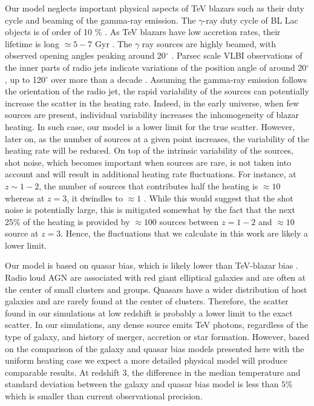 \documentclass[numberedappendix]{emulateapj}
\begin{document}
Our model neglects important physical aspects of TeV blazars such as their duty cycle and beaming of the gamma-ray emission. The $\gamma$-ray duty cycle of BL Lac objects is of order of 10 $\%$ \citep{1996ApJ...464..600S}. As TeV blazars have low accretion rates, their lifetime is long $\simeq 5-7$ Gyr \citep{2002ApJ...571..226C}. The $\gamma$ ray sources are highly beamed, with observed opening angles peaking around 20$^{\circ}$ \citep{2009A&A...507L..33P}. Parsec scale VLBI observations of the inner parts of radio jets indicate variations of the position angle of around 20$^{\circ}$, up to 120$^{\circ}$ over more than a decade \citep{2013AJ....146..120L}. Assuming the gamma-ray emission follows the orientation of the radio jet, the rapid variability of the sources can potentially increase the scatter in the heating rate. Indeed, in the early universe, when few sources are present,  individual variability increases the inhomogeneity of blazar heating. In such case, our model is a lower limit for the true scatter. However, later on, as the number of sources at a  given point increases, the variability of the heating rate will be reduced.    On top of the intrinsic  variability  of the sources, shot noise, which becomes important when sources are rare, is not taken into account and will result in additional heating rate fluctuations. For instance, at $z \sim 1-2$, the number of sources that contributes half the heating is $\approx 10$ whereas at $z = 3$, it dwindles to $\approx 1$ \citep{2012ApJ...752...23C}.   While this would suggest that the shot noise is potentially large, this is mitigated somewhat by the fact that the next 25\% of the heating is provided by $\approx 100$ sources between $z=1-2$ and $\approx 10$ source at $z=3$. Hence, the fluctuations that we calculate in this work are likely a lower limit.

Our model is based on quasar bias, which is likely lower than TeV-blazar bias \citep{2014ApJ...797...96A}. Radio loud AGN are associated with red giant elliptical galaxies \citep{2007A&A...476..723H} and are often at the center of small clusters and groups. Quasars have a wider distribution of host galaxies and are rarely found at the center of clusters. Therefore, the scatter found in our simulations at low redshift is probably a lower limit to the exact scatter. In our simulations, any dense source emits TeV photons, regardless of the type of galaxy, and history of merger, accretion or star formation. However, based on the comparison of the galaxy and quasar bias models presented here with the uniform heating case we expect a more detailed physical model will produce comparable results. At redshift 3, the difference in the median temperature and standard deviation between the galaxy and quasar bias model is less than $5\%$ which is smaller than current observational precision.
\end{document}
